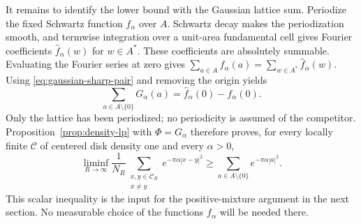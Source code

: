 It remains to identify the lower bound with the Gaussian lattice sum.
Periodize the fixed Schwartz function $f_\alpha$ over $A$.  Schwartz decay
makes the periodization smooth, and termwise integration over a unit-area
fundamental cell gives Fourier coefficients $\widehat f_\alpha(w)$ for
$w\in A^*$.  These coefficients are absolutely summable.  Evaluating the
Fourier series at zero gives
$\sum_{a\in A}f_\alpha(a)=\sum_{w\in A^*}\widehat f_\alpha(w)$.
Using \eqref{eq:gaussian-sharp-pair} and removing the origin yields
\begin{equation}\label{eq:gaussian-lattice-value}
 \sum_{a\in A\setminus\{0\}}G_\alpha(a)
 =\widehat f_\alpha(0)-f_\alpha(0).
\end{equation}
Only the lattice has been periodized; no periodicity is assumed of the
competitor.  Proposition~\ref{prop:density-lp} with $\Phi=G_\alpha$ therefore
proves, for every locally finite $\mathcal C$ of centered disk density one
and every $\alpha>0$,
\begin{equation}\label{eq:gaussian-energy}
 \liminf_{R\to\infty}\frac1{N_R}
 \sum_{\substack{x,y\in\mathcal C_R\\x\ne y}}
 e^{-\pi\alpha|x-y|^2}
 \ge\sum_{a\in A\setminus\{0\}}e^{-\pi\alpha|a|^2}.
\end{equation}
This scalar inequality is the input for the positive-mixture argument in the
next section.  No measurable choice of the functions $f_\alpha$ will be
needed there.
